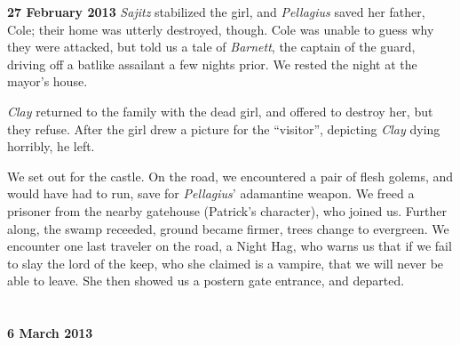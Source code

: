 \documentclass[letterpaper]{article}
\begin{document}
\textbf{27 February 2013} \emph{Sajitz} stabilized the girl, and \emph{Pellagius} saved her father, Cole; their home was utterly destroyed, though.  Cole was unable to guess why they were attacked, but told us a tale of \emph{Barnett}, the captain of the guard, driving off a batlike assailant a few nights prior. We rested the night at the mayor's house.\par
\emph{Clay} returned to the family with the dead girl, and offered to destroy her, but they refuse.  After the girl drew a picture for the ``visitor'', depicting \emph{Clay} dying horribly, he left.\par
We set out for the castle. On the road, we encountered a pair of flesh golems, and would have had to run, save for \emph{Pellagius}' adamantine weapon.  We freed a prisoner from the nearby gatehouse (Patrick's character), who joined us.  Further along, the swamp receeded, ground became firmer, trees change to evergreen.  We encounter one last traveler on the road, a Night Hag, who warns us that if we fail to slay the lord of the keep, who she claimed is a vampire, that we will never be able to leave.  She then showed us a postern gate entrance, and departed.  \\\\\\

\textbf{6 March 2013}
\end{document}

